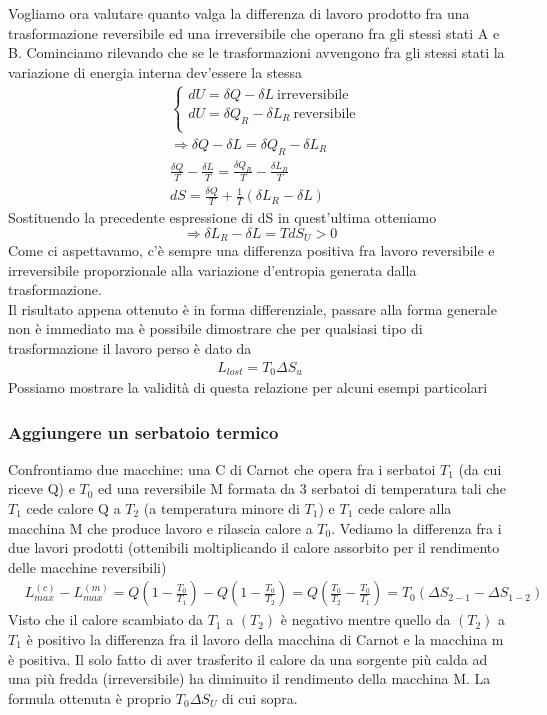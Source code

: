 \documentclass[
10pt, %
a4paper, %
oneside, %
headinclude,footinclude, %
BCOR5mm, %
]{scrartcl}
\begin{document}
Vogliamo ora valutare quanto valga la differenza di lavoro prodotto fra una trasformazione reversibile ed una irreversibile che operano fra gli stessi stati A e B. Cominciamo rilevando che se le trasformazioni avvengono fra gli stessi stati la variazione di energia interna dev'essere la stessa
\begin{align*}
	&\begin{cases}
		dU = \delta Q - \delta L\ \text{irreversibile}\\
		dU = \delta Q_R - \delta L_R\ \text{reversibile}\\
	\end{cases}	\\
	&\Rightarrow \delta Q - \delta L = \delta Q_R - \delta L_R\\
	&\frac{\delta Q}{T} - \frac{\delta L}{T} = \frac{\delta Q_R}{T} - \frac{\delta L_R}{T}\\
	&dS = \frac{\delta Q}{T}+\frac{1}{T}(\delta L_R-\delta L)
\end{align*}
Sostituendo la precedente espressione di dS in quest'ultima otteniamo
\[\Rightarrow \delta L_R-\delta L = T dS_U>0\]
Come ci aspettavamo, c'è sempre una differenza positiva fra lavoro reversibile e irreversibile proporzionale alla variazione d'entropia generata dalla trasformazione.\\
Il risultato appena ottenuto è in forma  differenziale, passare alla forma generale non è immediato ma è  possibile dimostrare che per qualsiasi tipo di trasformazione il lavoro perso è dato da
\begin{align}\label{eq:l_lost}
	L_{lost} = T_0 \Delta S_u
\end{align}
Possiamo mostrare la validità di questa relazione per alcuni esempi particolari
\subsubsection*{Aggiungere un serbatoio termico}
Confrontiamo due macchine: una C di Carnot che opera fra i serbatoi \(T_1\) (da cui riceve Q) e \(T_0\) ed una reversibile M formata da 3 serbatoi di temperatura tali che \(T_1\) cede calore Q a \(T_2\) (a temperatura minore di \(T_1\)) e \(T_1\) cede calore alla macchina M che produce lavoro e rilascia calore a \(T_0\). Vediamo la differenza fra i due lavori prodotti (ottenibili moltiplicando il calore assorbito per il rendimento delle macchine reversibili)
\begin{align*}
	&L_{max}^{(c)}-L_{max}^{(m)}=Q\left(1-\frac{T_0}{T_1}\right)-Q\left(1-\frac{T_0}{T_2}\right)=Q\left(\frac{T_0}{T_2}-\frac{T_0}{T_1}\right)=T_0(\Delta S_{2-1}-\Delta S_{1-2}) 
\end{align*}
Visto che il calore scambiato da \(T_1\) a \((T_2)\) è negativo mentre quello da \((T_2)\) a \(T_1\) è positivo la differenza fra il lavoro della macchina di Carnot e la macchina m è positiva. Il solo fatto di aver trasferito il calore da una sorgente più calda ad una più fredda (irreversibile) ha diminuito il rendimento della macchina M. La formula ottenuta è proprio \(T_0\Delta S_U\) di cui sopra. 
\end{document}
